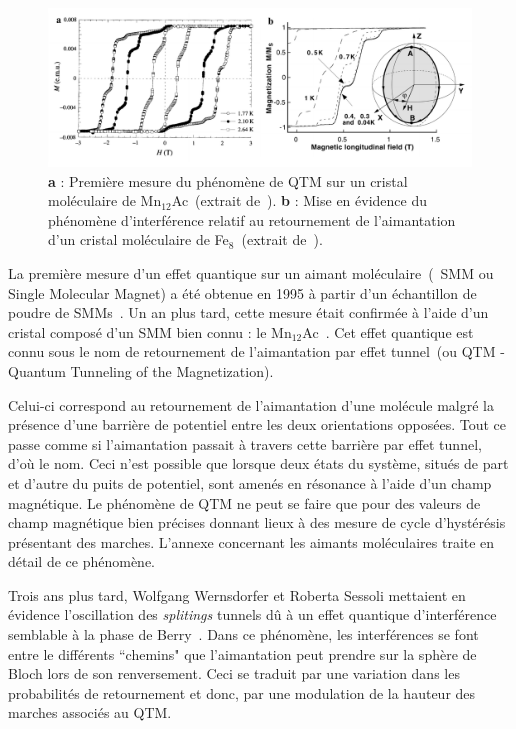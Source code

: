 \begin{figure}
\centering \includegraphics[scale=0.45]{Spintronique/MolecularMag/MolecularMag.pdf}
\caption{\textbf{a} : Première mesure du phénomène de QTM sur un cristal moléculaire de Mn$_{12}$Ac~(extrait de~\cite{Thomas1996}). \textbf{b} : Mise en évidence du phénomène d'interférence relatif au retournement de l'aimantation d'un cristal moléculaire de Fe$_{8}$~(extrait de~\cite{Wernsdorfer1999}).}
\label{MolecularMag}
\end{figure}

La première mesure d'un effet quantique sur un aimant moléculaire~(~SMM ou Single Molecular Magnet) a été obtenue en 1995 à partir d'un échantillon de poudre de SMMs~\cite{Friedman1996}. Un an plus tard, cette mesure était confirmée à l'aide d'un cristal composé d'un SMM bien connu : le Mn$_{12}$Ac~\cite{Thomas1996}. Cet effet quantique est connu sous le nom de retournement de l'aimantation par effet tunnel~(ou QTM - Quantum Tunneling of the Magnetization).

Celui-ci correspond au retournement de l'aimantation d'une molécule malgré la présence d'une barrière de potentiel entre les deux orientations opposées. Tout ce passe comme si l'aimantation passait à travers cette barrière par effet tunnel, d'où le nom. Ceci n'est possible que lorsque deux états du système, situés de part et d'autre du puits de potentiel, sont amenés en résonance à l'aide d'un champ magnétique. Le phénomène de QTM ne peut se faire que pour des valeurs de champ magnétique bien précises donnant lieux à des mesure de cycle d'hystérésis présentant des marches. L'annexe concernant les aimants moléculaires traite en détail de ce phénomène.

Trois ans plus tard, Wolfgang Wernsdorfer et Roberta Sessoli mettaient en évidence l'oscillation des \textit{splitings} tunnels dû à un effet quantique d'interférence semblable à la phase de Berry~\cite{Wernsdorfer1999}. Dans ce phénomène, les interférences se font entre le différents ``chemins" que l’aimantation peut prendre sur la sphère de Bloch lors de son renversement. Ceci se traduit par une variation dans les probabilités de retournement et donc, par une modulation de la hauteur des marches associés au QTM.

